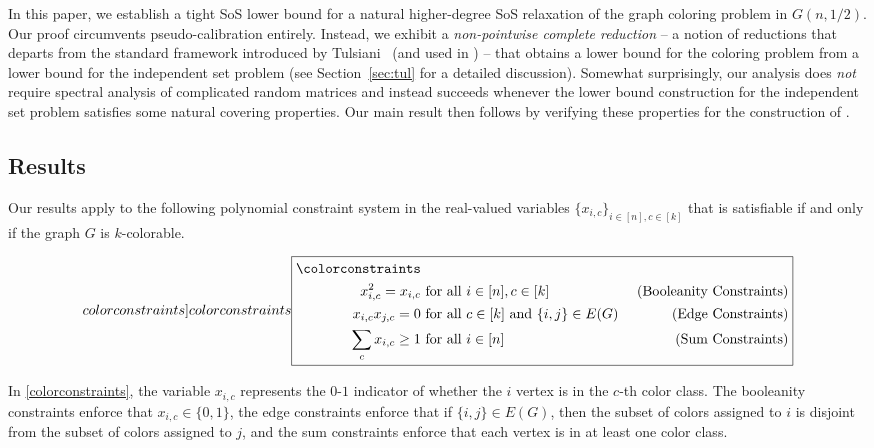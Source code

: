 In this paper, we establish a tight SoS lower bound for a natural higher-degree SoS relaxation of the graph coloring problem in $G(n,1/2)$. Our proof circumvents pseudo-calibration entirely. Instead, we exhibit a \emph{non-pointwise complete reduction} -- a notion of reductions that departs from the standard framework introduced by Tulsiani~\cite{MR2780076-Tulsiani09} (and used in \cite{DBLP:conf/soda/BhaskaraCVGZ12}) -- that  obtains a lower bound for the coloring problem from a lower bound for the independent set problem (see Section~\cref{sec:tul} for a detailed discussion). Somewhat surprisingly, our analysis does \emph{not} require spectral analysis of complicated random matrices and instead succeeds whenever the lower bound construction for the independent set problem satisfies some natural covering properties. Our main result then follows by verifying these properties for the construction of \cite{DBLP:conf/focs/BarakHKKMP16}.

\subsection{Results}
Our results apply to the following polynomial constraint system in the real-valued variables $\{x_{i,c}\}_{i \in[n], c \in [k]}$ that is satisfiable if and only if the graph $G$ is $k$-colorable.

\begin{center}
\begin{subequations}
\label[colorconstraints]{colorconstraints}
\boxed{
\begin{aligned}
\textrm{\colorconstraints} \\
x_{i,c}^2 = x_{i,c} &\text{ for all } i \in [n], c \in [k] & \ \text{(Booleanity Constraints)} \\
x_{i,c} x_{j,c} = 0 &\text{ for all } c\in [k] \text{ and } \{i,j\} \in E(G) & \ \text{(Edge Constraints)}  \\
\sum_{c} x_{i,c} \geq 1 &\text{ for all } i \in [n] & \ \text{(Sum Constraints)}
\end{aligned}
}
\end{subequations}
\end{center}
 In \cref{colorconstraints}, the variable $x_{i,c}$ represents the $0$-$1$ indicator of whether the $i$ vertex is in the $c$-th color class.
 The booleanity constraints enforce that $x_{i,c} \in \{0,1\}$, the edge constraints enforce that if $\{i,j\} \in E(G)$, then the subset of colors assigned to $i$ is disjoint from the subset of colors assigned to $j$, and the sum constraints enforce that each vertex is in at least one color class.

